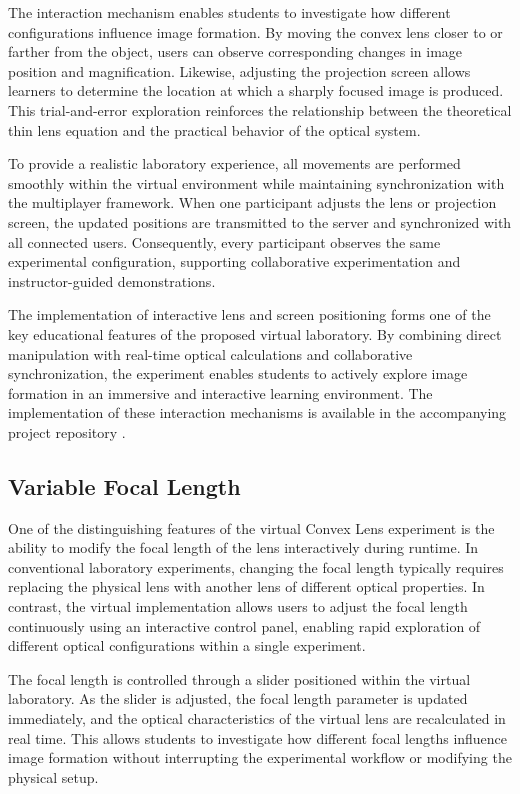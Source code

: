 The interaction mechanism enables students to investigate how different configurations influence image formation. By moving the convex lens closer to or farther from the object, users can observe corresponding changes in image position and magnification. Likewise, adjusting the projection screen allows learners to determine the location at which a sharply focused image is produced. This trial-and-error exploration reinforces the relationship between the theoretical thin lens equation and the practical behavior of the optical system.

To provide a realistic laboratory experience, all movements are performed smoothly within the virtual environment while maintaining synchronization with the multiplayer framework. When one participant adjusts the lens or projection screen, the updated positions are transmitted to the server and synchronized with all connected users. Consequently, every participant observes the same experimental configuration, supporting collaborative experimentation and instructor-guided demonstrations.

The implementation of interactive lens and screen positioning forms one of the key educational features of the proposed virtual laboratory. By combining direct manipulation with real-time optical calculations and collaborative synchronization, the experiment enables students to actively explore image formation in an immersive and interactive learning environment. The implementation of these interaction mechanisms is available in the accompanying project repository \cite{thesisRepo}.

\subsection{Variable Focal Length}

One of the distinguishing features of the virtual Convex Lens experiment is the ability to modify the focal length of the lens interactively during runtime. In conventional laboratory experiments, changing the focal length typically requires replacing the physical lens with another lens of different optical properties. In contrast, the virtual implementation allows users to adjust the focal length continuously using an interactive control panel, enabling rapid exploration of different optical configurations within a single experiment.

The focal length is controlled through a slider positioned within the virtual laboratory. As the slider is adjusted, the focal length parameter is updated immediately, and the optical characteristics of the virtual lens are recalculated in real time. This allows students to investigate how different focal lengths influence image formation without interrupting the experimental workflow or modifying the physical setup.

